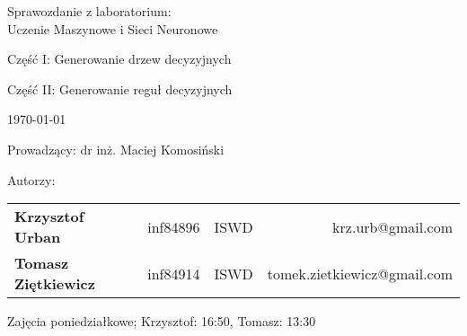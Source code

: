 \thispagestyle{empty} %

\begin{center}
{\large{Sprawozdanie z laboratorium:\\
Uczenie Maszynowe i Sieci Neuronowe}}

\vspace{3ex}

Część I: Generowanie drzew decyzyjnych

Część II: Generowanie reguł decyzyjnych


\vspace{3ex}
{\footnotesize\today}

\end{center}


\vspace{10ex}

Prowadzący: dr inż. Maciej Komosiński

\vspace{5ex}

Autorzy:
\begin{tabular}{lllr}
\textbf{Krzysztof Urban} & inf84896 & ISWD & krz.urb@gmail.com \\
\textbf{Tomasz Ziętkiewicz} & inf84914 & ISWD & tomek.zietkiewicz@gmail.com \\
\end{tabular}

\vspace{5ex}

Zajęcia poniedziałkowe; Krzysztof: 16:50, Tomasz: 13:30

\newpage

